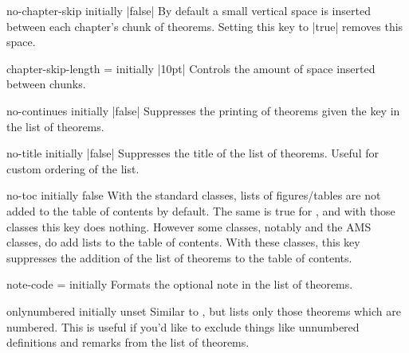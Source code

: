 \documentclass{ltxdoc}
\newcommand{\ttbraces}[1]{\braces{\texttt{#1}}}
\begin{document}
\begin{docKey}{no-chapter-skip}
  {}
  {initially |false|}
By default a small vertical space is inserted between each chapter's chunk of theorems.
Setting this key to |true| removes this space.
\end{docKey}

\begin{docKey}{chapter-skip-length}
  {=}
  {initially |10pt|}
Controls the amount of space inserted between chunks.
\end{docKey}

\begin{docKey}{no-continues}
  {}
  {initially |false|}
Suppresses the printing of theorems given the  key in the list of theorems.
\end{docKey}

\begin{docKey}{no-title}
  {}
  {initially |false|}
Suppresses the title of the list of theorems.
Useful for custom ordering of the list.

\begin{keythmscode}[]
\listofkeytheorems[show=example]
\listofkeytheorems[show=solution, no-title]
\end{keythmscode}

\end{docKey}

\begin{docKey}{no-toc}
  {}
  {initially false}
With the standard classes, lists of figures/tables are not added to the table of contents by default. The same is true for , and with those classes this key does nothing. However some classes, notably  and the AMS classes, do add lists to the table of contents. With these classes, this key suppresses the addition of the list of theorems to the table of contents.
\end{docKey}

\begin{docKey}{note-code}
  {=}
  {initially \ttbraces{ (\#1)}}
Formats the optional note in the list of theorems.
\end{docKey}

\begin{docKey}{onlynumbered}
  {}
  {initially unset}
Similar to , but lists only those theorems which are numbered.
This is useful if you'd like to exclude things like unnumbered definitions and remarks from the list of theorems.
\end{docKey}
\end{document}
